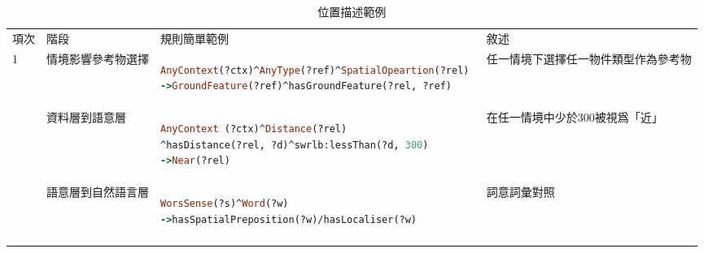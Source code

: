 \begin{table}[htbp]
\centering
\caption{位置描述範例}
\label{tab:dailyLocaTable}
\begin{adjustbox}{max width=\textwidth}
\renewcommand{\arraystretch}{1.4}
\begin{tabular}{
>{\centering\arraybackslash}m{1cm} >{\centering\arraybackslash}m{3.5cm} >{\centering\arraybackslash}m{7.5cm} >{\centering\arraybackslash}m{5cm}}
\Xhline{1.2pt}
項次 & 階段 & 規則簡單範例 & 敘述 \\
\Xhline{1.2pt}
1 & 情境影響參考物選擇 & \begin{lstlisting}[language=Prolog, basicstyle=\ttfamily, xleftmargin=2em]
AnyContext(?ctx)^AnyType(?ref)^SpatialOpeartion(?rel) 
->GroundFeature(?ref)^hasGroundFeature(?rel, ?ref)
\end{lstlisting} & 任一情境下選擇任一物件類型作為參考物 \\
\hline
2 & 資料層到語意層 & \begin{lstlisting}[language=Prolog, basicstyle=\ttfamily, xleftmargin=2em]
AnyContext (?ctx)^Distance(?rel)
^hasDistance(?rel, ?d)^swrlb:lessThan(?d, 300)
->Near(?rel)
\end{lstlisting} & 在任一情境中少於300被視爲「近」 \\
\hline
3 & 語意層到自然語言層 & \begin{lstlisting}[language=Prolog, basicstyle=\ttfamily, xleftmargin=2em]
WorsSense(?s)^Word(?w)
->hasSpatialPreposition(?w)/hasLocaliser(?w)
\end{lstlisting} & 詞意詞彙對照 \\
\hline
\Xhline{1.2pt}
\end{tabular}
\end{adjustbox}
\end{table}